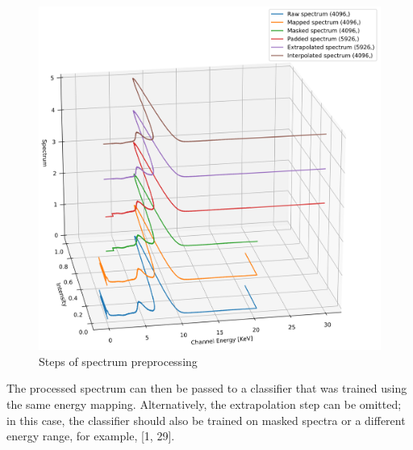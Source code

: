 \begin{figure}[H] 
  \centering     
  \includegraphics[width=1\textwidth]{img/spectrum_preprocessing.png} 
  \caption{Steps of spectrum preprocessing}
  \label{fig:spectrum_preprocessing}
\end{figure}

The processed spectrum can then be passed to a classifier that was trained using the same energy mapping. 
Alternatively, the extrapolation step can be omitted; in this case, the classifier should also be trained on masked spectra or a different energy range, for example, [1, 29].